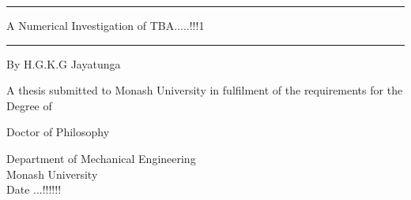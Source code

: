 \documentclass[11pt,titlepage,twoside,a4paper]{report}
\newcommand{\myclearpage}{\thispagestyle{empty}\cleartoevenpage\thispagestyle{empty}\cleartooddpage}
\begin{document}
\begin{titlepage}
\noindent\rule{\textwidth}{1.5pt}
\begin{flushright}
\LARGE
{\sc A Numerical Investigation of TBA.....!!!1} \\

\noindent\rule{\textwidth}{1.5pt}

\LARGE
\vspace{30mm}
{\sc By H.G.K.G Jayatunga}
\vspace{30mm}

\normalsize
{\sc A thesis submitted to Monash University in fulfilment of the requirements for the Degree of}

\vspace{5mm}
\LARGE
{\sc Doctor of Philosophy}

\vspace{15mm}
\normalsize
Department of Mechanical Engineering\\
Monash University\\
Date ...!!!!!!
\end{flushright}

\end{titlepage}

\myclearpage



\myclearpage

\myclearpage

\myclearpage

\myclearpage

\myclearpage
\tableofcontents
\newpage
\myclearpage
{}

\myclearpage



\end{document}
